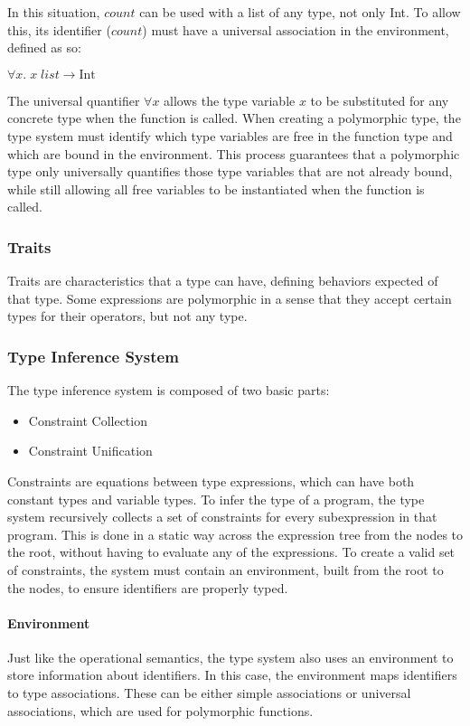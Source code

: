 \documentclass{article}
\begin{document}
In this situation, $count$ can be used with a list of any type, not only Int.
To allow this, its identifier ($count$) must have a universal association in the environment, defined as so:

\smallskip
$\forall x. \; x \; list \rightarrow \mbox{Int}$
\smallskip

The universal quantifier $\forall x$ allows the type variable $x$ to be substituted for any concrete type when the function is called.
When creating a polymorphic type, the type system must identify which type variables are free in the function type and which are bound in the environment.
This process guarantees that a polymorphic type only universally quantifies those type variables that are not already bound, while still allowing all free variables to be instantiated when the function is called.

\subsubsection{Traits}

Traits are characteristics that a type can have, defining behaviors expected of that type.
Some expressions are polymorphic in a sense that they accept certain types for their operators, but not any type.

\subsubsection{Type Inference System}

The type inference system is composed of two basic parts:
\begin{itemize}
  \item Constraint Collection
  \item Constraint Unification
\end{itemize}

Constraints are equations between type expressions, which can have both constant types and variable types.
To infer the type of a program, the type system recursively collects a set of constraints for every subexpression in that program.
This is done in a static way across the expression tree from the nodes to the root, without having to evaluate any of the expressions.
To create a valid set of constraints, the system must contain an environment, built from the root to the nodes, to ensure identifiers are properly typed.

\paragraph{Environment}
Just like the operational semantics, the type system also uses an environment to store information about identifiers.
In this case, the environment maps identifiers to type associations.
These can be either simple associations or universal associations, which are used for polymorphic functions.
\end{document}
